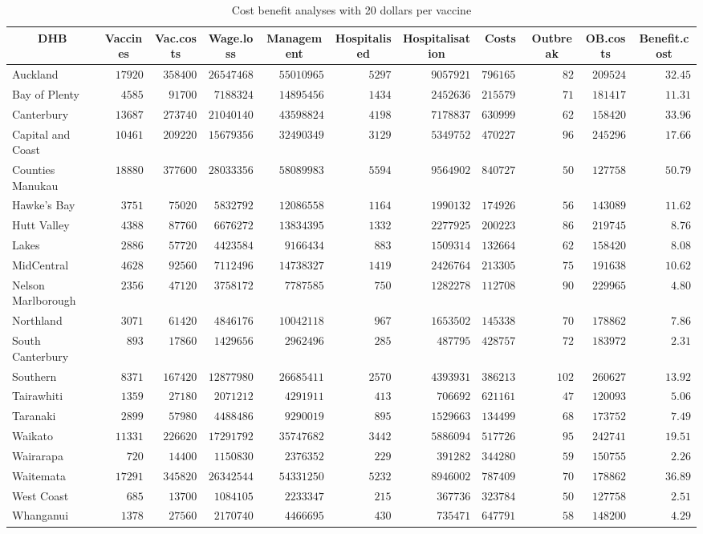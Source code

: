\documentclass{article}
\begin{document}
\begin{table}\small
\caption{Cost benefit analyses with 20 dollars per vaccine}
\begin{center}
\begin{tabular}{lrrrrrrrrrr}
\hline\hline
\multicolumn{1}{c}{DHB}&\multicolumn{1}{c}{Vaccines}&\multicolumn{1}{c}{Vac.costs}&\multicolumn{1}{c}{Wage.loss}&\multicolumn{1}{c}{Management}&\multicolumn{1}{c}{Hospitalised}&\multicolumn{1}{c}{Hospitalisation}&\multicolumn{1}{c}{Costs}&\multicolumn{1}{c}{Outbreak}&\multicolumn{1}{c}{OB.costs}&\multicolumn{1}{c}{Benefit.cost}\tabularnewline
\hline
Auckland&$17920$&$358400$&$26547468$&$55010965$&$5297$&$9057921$&$79616516$&$ 82$&$209524$&$32.45$\tabularnewline
Bay of Plenty&$ 4585$&$ 91700$&$ 7188324$&$14895456$&$1434$&$2452636$&$21557962$&$ 71$&$181417$&$11.31$\tabularnewline
Canterbury&$13687$&$273740$&$21040140$&$43598824$&$4198$&$7178837$&$63099902$&$ 62$&$158420$&$33.96$\tabularnewline
Capital and Coast&$10461$&$209220$&$15679356$&$32490349$&$3129$&$5349752$&$47022778$&$ 96$&$245296$&$17.66$\tabularnewline
Counties Manukau&$18880$&$377600$&$28033356$&$58089983$&$5594$&$9564902$&$84072731$&$ 50$&$127758$&$50.79$\tabularnewline
Hawke's Bay&$ 3751$&$ 75020$&$ 5832792$&$12086558$&$1164$&$1990132$&$17492688$&$ 56$&$143089$&$11.62$\tabularnewline
Hutt Valley&$ 4388$&$ 87760$&$ 6676272$&$13834395$&$1332$&$2277925$&$20022305$&$ 86$&$219745$&$ 8.76$\tabularnewline
Lakes&$ 2886$&$ 57720$&$ 4423584$&$ 9166434$&$ 883$&$1509314$&$13266438$&$ 62$&$158420$&$ 8.08$\tabularnewline
MidCentral&$ 4628$&$ 92560$&$ 7112496$&$14738327$&$1419$&$2426764$&$21330552$&$ 75$&$191638$&$10.62$\tabularnewline
Nelson Marlborough&$ 2356$&$ 47120$&$ 3758172$&$ 7787585$&$ 750$&$1282278$&$11270851$&$ 90$&$229965$&$ 4.80$\tabularnewline
Northland&$ 3071$&$ 61420$&$ 4846176$&$10042118$&$ 967$&$1653502$&$14533802$&$ 70$&$178862$&$ 7.86$\tabularnewline
South Canterbury&$  893$&$ 17860$&$ 1429656$&$ 2962496$&$ 285$&$ 487795$&$ 4287574$&$ 72$&$183972$&$ 2.31$\tabularnewline
Southern&$ 8371$&$167420$&$12877980$&$26685411$&$2570$&$4393931$&$38621382$&$102$&$260627$&$13.92$\tabularnewline
Tairawhiti&$ 1359$&$ 27180$&$ 2071212$&$ 4291911$&$ 413$&$ 706692$&$ 6211616$&$ 47$&$120093$&$ 5.06$\tabularnewline
Taranaki&$ 2899$&$ 57980$&$ 4488486$&$ 9290019$&$ 895$&$1529663$&$13449923$&$ 68$&$173752$&$ 7.49$\tabularnewline
Waikato&$11331$&$226620$&$17291792$&$35747682$&$3442$&$5886094$&$51772645$&$ 95$&$242741$&$19.51$\tabularnewline
Wairarapa&$  720$&$ 14400$&$ 1150830$&$ 2376352$&$ 229$&$ 391282$&$ 3442806$&$ 59$&$150755$&$ 2.26$\tabularnewline
Waitemata&$17291$&$345820$&$26342544$&$54331250$&$5232$&$8946002$&$78740929$&$ 70$&$178862$&$36.89$\tabularnewline
West Coast&$  685$&$ 13700$&$ 1084105$&$ 2233347$&$ 215$&$ 367736$&$ 3237846$&$ 50$&$127758$&$ 2.51$\tabularnewline
Whanganui&$ 1378$&$ 27560$&$ 2170740$&$ 4466695$&$ 430$&$ 735471$&$ 6477915$&$ 58$&$148200$&$ 4.29$\tabularnewline
\hline
\end{tabular}\end{center}\label{table:cost20}
\end{table}
\end{document}
